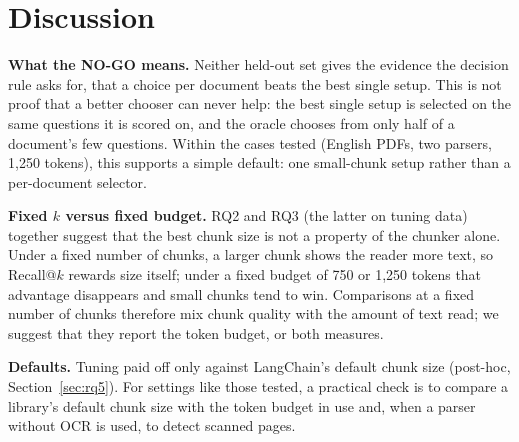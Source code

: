 \section{Discussion}\label{sec:discussion}

\textbf{What the NO-GO means.} Neither held-out set gives the evidence the decision rule asks
for, that a choice per document beats the best single setup.
This is not proof that a better chooser can never help: the best single setup is
selected on the same questions it is scored on, and the oracle chooses from only
half of a document's few questions.  Within the cases tested (English PDFs, two parsers, 1,250
tokens), this supports a simple default: one small-chunk setup rather than a
per-document selector.

\textbf{Fixed $k$ versus fixed budget.} RQ2 and RQ3 (the latter on tuning data)
together suggest that the best chunk size is not a property of the chunker alone.
Under a fixed number of chunks, a larger chunk shows the reader more text, so
Recall@$k$ rewards size itself; under a fixed budget of 750 or 1,250 tokens that
advantage disappears and small chunks tend to win. Comparisons at a fixed number of chunks therefore mix chunk quality with the
amount of text read; we suggest that they report the token budget, or both
measures.

\textbf{Defaults.} Tuning paid off only against LangChain's default chunk size
(post-hoc, Section~\ref{sec:rq5}). For settings like those tested, a practical check is to
compare a library's default chunk size with the token budget in use and, when a
parser without OCR is used, to detect scanned pages.
